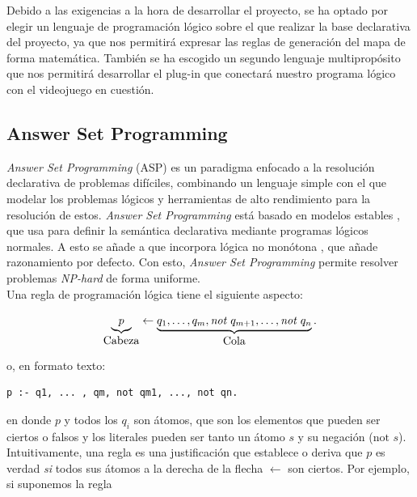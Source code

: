 Debido a las exigencias a la hora de desarrollar el proyecto, se ha optado por elegir un lenguaje de programación lógico sobre el que realizar la base declarativa del proyecto, ya que nos permitirá expresar las reglas de generación del mapa de forma matemática. También se ha escogido un segundo lenguaje multipropósito que nos permitirá desarrollar el plug-in que conectará nuestro programa lógico con el videojuego en cuestión.

\subsection{Answer Set Programming}\label{subsec:asp}

\textit{Answer Set Programming} (ASP) \cite{asp} es un paradigma enfocado a la resolución declarativa de problemas difíciles, combinando un lenguaje simple con el que modelar los problemas lógicos y herramientas de alto rendimiento para la resolución de estos. \textit{Answer Set Programming} está basado en modelos estables \cite{stablemodels}, que usa para definir la semántica declarativa mediante programas lógicos normales. A esto se añade a que incorpora lógica no monótona \cite{nonmonotonic}, que añade razonamiento por defecto. Con esto, \textit{Answer Set Programming} permite resolver problemas \textit{NP-hard} de forma uniforme. \\

Una regla de programación lógica tiene el siguiente aspecto:

\begin{equation}
	\underbrace{p}_{\text{\normalsize Cabeza}} \leftarrow \underbrace{q_1, \dotsc, q_m , \textit{not } q_{m+1} ,\dotsc, \textit{not } q_n}_{\text{\normalsize Cola}}.
\end{equation}

\hspace{1em}

o, en formato texto:

\begin{lstlisting}[label=lst:qreached]
p :- q1, ... , qm, not qm1, ..., not qn.
\end{lstlisting}

en donde $p$ y todos los $q_i$ son átomos, que son los elementos que pueden ser ciertos o falsos y los literales pueden ser tanto un átomo $s$ y su negación ($\text{not } s$). Intuitivamente, una regla es una justificación que establece o deriva que $p$ es verdad \textit{si} todos sus átomos a la derecha de la flecha $\leftarrow$ son ciertos. Por ejemplo, si suponemos la regla

